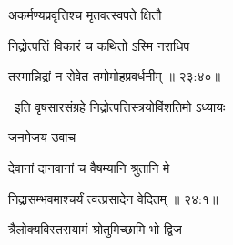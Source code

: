 {\devanagarifont अकर्मण्यप्रवृत्तिश्च मृतवत्स्वपते क्षितौ \thinspace{\dandab} \dontdisplaylinenum }%
 
{\devanagarifont निद्रोत्पत्तिं विकारं च कथितो ऽस्मि नराधिप  \danda\dontdisplaylinenum }%


{\devanagarifont तस्मान्निद्रां न सेवेत तमोमोहप्रवर्धनीम् {॥ २३:४०॥} \veg\dontdisplaylinenum }%

{\devanagarifont 
\jump
\begin{center}
\ketdanda~इति वृषसारसंग्रहे निद्रोत्पत्तिस्त्रयोविंशतिमो ऽध्यायः~\ketdanda
\end{center}
\dontdisplaylinenum\vers  }%
\bekveg\szamveg
\vfill
\phpspagebreak

\thispagestyle{empty}

\centerline{\Large\devanagarifontbold [   चतुर्विंशतिमो ऽध्यायः  ]}{\vrule depth10pt width0pt} 
\fancyhead[LE]{}
\fancyhead[RE]{}
\fancyhead[LO]{}
\fancyhead[RO]{}
\szam\bek


\vers


{\devanagarifont जनमेजय उवाच {\dandab}\dontdisplaylinenum  }%
 
{\devanagarifont देवानां दानवानां च वैषम्यानि श्रुतानि मे \thinspace{\danda} \dontdisplaylinenum }%


{\devanagarifont निद्रासम्भवमाश्चर्यं त्वत्प्रसादेन वेदितम् {॥ २४:१॥} \veg\dontdisplaylinenum }%

{\devanagarifont त्रैलोक्यविस्तरायामं श्रोतुमिच्छामि भो द्विज \thinspace{\dandab} \dontdisplaylinenum }%

